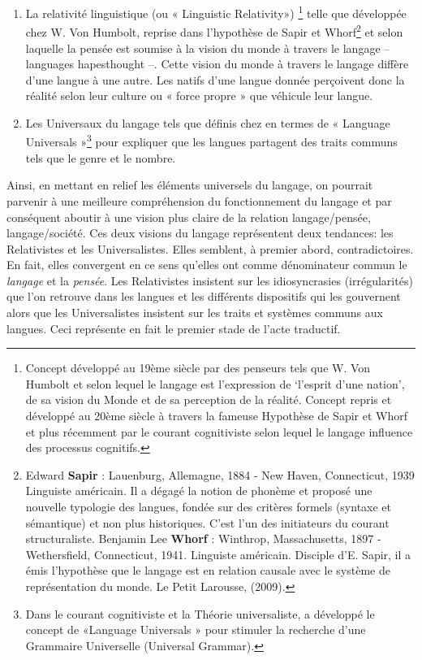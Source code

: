 \documentclass[french]{textolivre}
\begin{document}
\begin{enumerate}[label={\alph*)}]
    \item La relativité linguistique (ou « Linguistic Relativity») \cite{casasanto2008, drivonikou2007}\footnote{Concept développé au 19ème siècle par des penseurs tels que W. Von Humbolt et selon lequel le langage est l’expression de ‘l’esprit d’une nation’, de sa vision du Monde et de sa perception de la réalité. Concept repris et développé au 20ème siècle à travers la fameuse Hypothèse de Sapir et Whorf et plus récemment par le courant cognitiviste selon lequel le langage influence des processus cognitifs.} telle que développée chez W. Von Humbolt, reprise dans l’hypothèse de Sapir et Whorf\footnote{Edward \textbf{Sapir} : Lauenburg, Allemagne, 1884 - New Haven, Connecticut, 1939 Linguiste américain. Il a dégagé la notion de phonème et proposé une nouvelle typologie des langues, fondée sur des critères formels (syntaxe et sémantique) et non plus historiques. C'est l'un des initiateurs du courant structuraliste. \newline Benjamin Lee \textbf{Whorf} : Winthrop, Massachusetts, 1897 - Wethersfield, Connecticut, 1941. Linguiste américain. Disciple d’E. Sapir, il a émis l'hypothèse que le langage est en relation causale avec le système de représentation du monde. Le Petit Larousse, (2009).} et selon laquelle la pensée est soumise à la vision du monde à travers le langage – languages hapesthought –. Cette vision du monde à travers le langage diffère d’une langue à une autre. Les natifs d’une langue donnée perçoivent donc la réalité selon leur culture ou « force propre » que véhicule leur langue.
    \item Les Universaux du langage tels que définis chez \textcite{chomsky1964, chomsky1965} en termes de « Language Universals »\footnote{Dans le courant cognitiviste et la Théorie universaliste, \textcite{chomsky1964, chomsky1965} a développé le concept de «Language Universals » pour stimuler la recherche d’une Grammaire Universelle (Universal Grammar).} pour expliquer que les langues partagent des traits communs tels que le genre et le nombre.
\end{enumerate}

Ainsi, en mettant en relief les éléments universels du langage, on pourrait parvenir à une meilleure compréhension du fonctionnement du langage et par conséquent aboutir à une vision plus claire de la relation langage/pensée, langage/société. Ces deux visions du langage représentent deux tendances: les Relativistes et les Universalistes. Elles semblent, à premier abord, contradictoires. En fait, elles convergent en ce sens qu’elles ont comme dénominateur commun le \emph{langage} et la \emph{pensée}. Les Relativistes insistent sur les idiosyncrasies (irrégularités) que l’on retrouve dans les langues et les différents dispositifs qui les gouvernent alors que les Universalistes insistent sur les traits et systèmes communs aux langues. Ceci représente en fait le premier stade de l’acte traductif.
\end{document}

